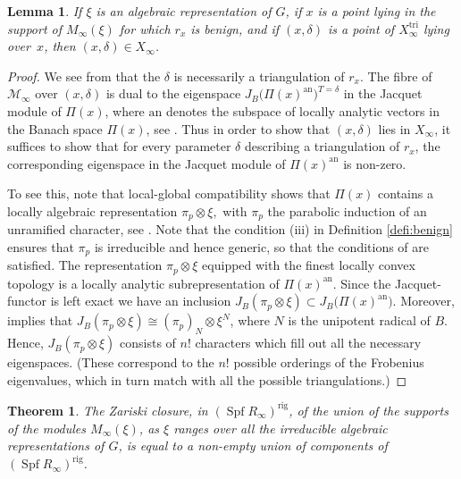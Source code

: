 \documentclass[11pt]{article}
\let\mathcal\mathscr
\newtheorem{lem}[prop]{Lemma}
\newtheorem{thm}[prop]{Theorem}
\theoremstyle{definition}
\DeclareMathOperator{\Spf}{Spf}
\newcommand{\cM}{\mathcal{M}}
\newcommand{\ana}{\mathrm{an}}
\newcommand\rig{\mathrm{rig}}
\newcommand\tri{\mathrm{tri}}
\begin{document}
\begin{lem}
\label{lem:refinements}
If $\xi$ is an algebraic representation of $G$,
if $x$ is a point lying in the support of $M_{\infty}(\xi)$ for which
$r_x$ is benign, and if $(x,\delta)$ is a point of $X_{\infty}^{\tri}$
lying over~$x$, then $(x,\delta) \in X_{\infty}$.
\end{lem}

\begin{proof}
We see from \cite[Cor.\,2.12]{BHS} that the $\delta$ is necessarily
a triangulation of $r_x$.
The fibre of $\cM_{\infty}$ over $(x,\delta)$ is dual to the eigenspace
$J_B\bigl(\Pi(x)^{\ana}\bigr)^{T = \delta}$ in the Jacquet module of $\Pi(x)$, where $\ana$ denotes the subspace
of locally analytic vectors in the Banach space $\Pi(x)$, see \cite[Prop.\,3.7]{BHS}.
Thus in order to show that $(x,\delta)$ lies in $X_{\infty}$,
it suffices to show that for every parameter $\delta$ describing
a triangulation of $r_x$, the corresponding eigenspace in the Jacquet
module of $\Pi(x)^{\ana}$ is non-zero.\enlargethispage{\baselineskip}%

To see this, note that local-global compatibility shows that $\Pi(x)$
contains a locally algebraic representation $\pi_p \otimes \xi,$
with $\pi_p$ the parabolic induction of an unramified character, see \cite[Th.\,4.35]{six-authors}. Note that the condition (iii) in Definition
\ref{defi:benign} ensures that $\pi_p$ is irreducible and hence generic, so that the conditions of \cite[Th.\,4.35]{six-authors} are satisfied.
The representation $\pi_p \otimes \xi$ equipped with the finest locally convex topology is a locally analytic subrepresentation
of $\Pi(x)^{\ana}$. Since the Jacquet-functor is left exact we have an inclusion $J_B(\pi_p \otimes \xi)\subset J_B\bigl(\Pi(x)^{\ana}\bigr)$.
Moreover, \cite[Prop.\,4.3.6]{Jacquet-one} implies that $J_B(\pi_p \otimes \xi)\cong (\pi_p)_N \otimes \xi^N$, where $N$ is the unipotent radical
of $B$. Hence, $J_B(\pi_p\otimes\xi)$ consists of $n!$ characters which fill out
all the necessary eigenspaces. (These correspond to the $n!$ possible
orderings of the Frobenius eigenvalues, which in turn
match with all the possible triangulations.)
\end{proof}

\begin{thm}
The Zariski closure, in $(\Spf R_{\infty})^{\rig}$, of the
union of the supports of the modules $M_{\infty}(\xi)$,
as $\xi$ ranges over all the irreducible algebraic representations
of $G$, is equal to a non-empty union of components
of $(\Spf R_{\infty})^{\rig}$.
\end{thm}
\end{document}
